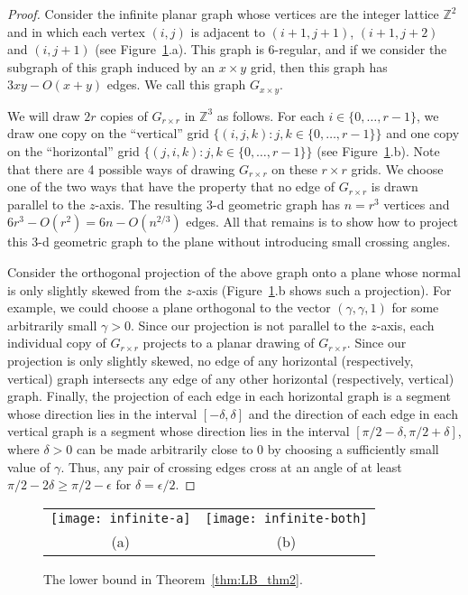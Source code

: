 \documentclass{patmorin}
\newcommand{\Z}{\mathbb{Z}}
\newcommand{\figlabel}[1]{\label{fig:#1}}
\newcommand{\figref}[1]{\mbox{Figure~\ref{fig:#1}}}
\newcommand{\thmref}[1]{Theorem~\ref{thm:#1}}
\begin{document}
\begin{proof}
Consider the infinite planar graph whose vertices are the integer lattice
$\Z^2$ and in which each vertex $(i,j)$ is adjacent to $(i+1,j+1)$,
$(i+1,j+2)$ and $(i,j+1)$ (see \figref{infinite}.a).  This graph is
6-regular, and if we consider the subgraph of this graph induced by an
$x\times y$ grid, then this graph has $3xy - O(x+y)$ edges.  We call
this graph $G_{x\times y}$.

We will draw $2r$ copies of $G_{r\times r}$ in $\Z^3$ as follows.
For each $i\in\{0,\ldots,r-1\}$, we draw one copy on the ``vertical'' grid
$\{ (i,j,k) : j,k\in\{0,\ldots,r-1\}\}$ and one copy on the ``horizontal''
grid $\{ (j,i,k) : j,k\in\{0,\ldots,r-1\}\}$ (see
\figref{infinite}.b). Note that there are 4 possible ways of drawing $G_{r\times r}$ on these
$r\times r$ grids.  We choose one of the two ways that have the property
that no edge of $G_{r\times r}$ is drawn parallel to the $z$-axis.
The resulting 3-d geometric graph has $n=r^3$ vertices and $6r^3 -
O(r^2)=6n-O(n^{2/3})$ edges.  All that remains is to show how to
project this 3-d geometric graph to the plane without introducing small
crossing angles.

Consider the orthogonal projection of the above graph onto a plane whose
normal is only slightly skewed from the $z$-axis (\figref{infinite}.b
shows such a projection).  For example, we could choose a plane orthogonal
to the vector $(\gamma,\gamma,1)$ for some arbitrarily small $\gamma>0$.
Since our projection is not parallel to the $z$-axis, each individual copy of
$G_{r\times r}$ projects to a planar drawing of $G_{r\times r}$.  
Since our projection
is only slightly skewed, no edge of any horizontal (respectively,
vertical) graph intersects any edge of any other horizontal (respectively,
vertical) graph.  Finally, the projection of each edge in each horizontal
graph is a segment whose direction lies in the interval $[-\delta,\delta]$
and the direction of each edge in each vertical graph is a segment whose
direction lies in the interval $[\pi/2-\delta,\pi/2+\delta]$, where
$\delta>0$ can be made arbitrarily close to 0 by choosing a sufficiently
small value of $\gamma$.  Thus,
any pair of crossing edges cross at an angle of at least $\pi/2-2\delta \ge \pi/2-\epsilon$ for $\delta=\epsilon/2$.
\end{proof}

\begin{figure}
  \begin{center}
  \begin{tabular}{cc}
    \texttt{[image: infinite-a]} &
    \texttt{[image: infinite-both]} \\
    (a) & (b)
  \end{tabular}
  \end{center}
  \caption{The lower bound in \thmref{LB_thm2}.}
  \figlabel{infinite}
\end{figure}
\end{document}
